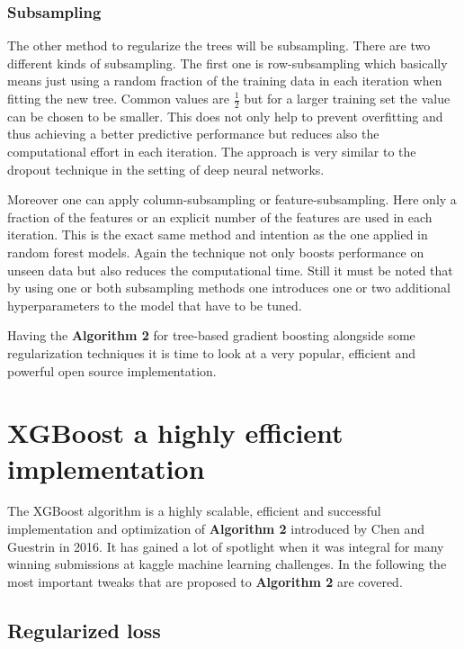 \documentclass[
]{book}
\begin{document}
\hypertarget{subsampling}{%
\subsubsection{Subsampling}\label{subsampling}}

The other method to regularize the trees will be subsampling. There are two different kinds of subsampling. The first one is row-subsampling which basically means just using a random fraction of the training data in each iteration when fitting the new tree. Common values are \(\frac{1}{2}\) but for a larger training set the value can be chosen to be smaller. This does not only help to prevent overfitting and thus achieving a better predictive performance but reduces also the computational effort in each iteration.\citep{elements} The approach is very similar to the dropout technique in the setting of deep neural networks.

Moreover one can apply column-subsampling or feature-subsampling. Here only a fraction of the features or an explicit number of the features are used in each iteration. This is the exact same method and intention as the one applied in random forest models. Again the technique not only boosts performance on unseen data but also reduces the computational time.\citep{xgboostPaper} Still it must be noted that by using one or both subsampling methods one introduces one or two additional hyperparameters to the model that have to be tuned.

Having the \textbf{Algorithm 2} for tree-based gradient boosting alongside some regularization techniques it is time to look at a very popular, efficient and powerful open source implementation.

\hypertarget{xgboost-a-highly-efficient-implementation}{%
\section{XGBoost a highly efficient implementation}\label{xgboost-a-highly-efficient-implementation}}

The XGBoost algorithm is a highly scalable, efficient and successful implementation and optimization of \textbf{Algorithm 2} introduced by Chen and Guestrin in 2016.\citep[\citet{HandsOnMLwithR}]{xgboostPaper} It has gained a lot of spotlight when it was integral for many winning submissions at kaggle machine learning challenges. In the following the most important tweaks that are proposed to \textbf{Algorithm 2} are covered.

\hypertarget{regularized-loss}{%
\subsection{Regularized loss}\label{regularized-loss}}
\end{document}
